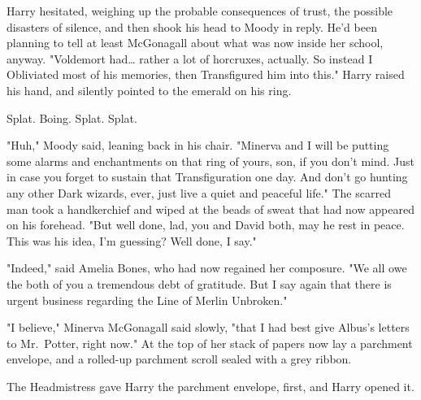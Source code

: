 Harry hesitated, weighing up the probable consequences of trust, the possible
disasters of silence, and then shook his head to Moody in reply. He'd been
planning to tell at least McGonagall about what was now inside her school,
anyway. "Voldemort had{\ldots} rather a lot of horcruxes, actually. So instead
I Obliviated most of his memories, then Transfigured him into this." Harry
raised his hand, and silently pointed to the emerald on his ring.

Splat. Boing. Splat. Splat.

"Huh," Moody said, leaning back in his chair. "Minerva and I will be putting
some alarms and enchantments on that ring of yours, son, if you don't mind.
Just in case you forget to sustain that Transfiguration one day. And don't go
hunting any other Dark wizards, ever, just live a quiet and peaceful life." The
scarred man took a handkerchief and wiped at the beads of sweat that had now
appeared on his forehead. "But well done, lad, you and David both, may he rest
in peace. This was his idea, I'm guessing? Well done, I say."

"Indeed," said Amelia Bones, who had now regained her composure. "We all owe
the both of you a tremendous debt of gratitude. But I say again that there is
urgent business regarding the Line of Merlin Unbroken."

"I believe," Minerva McGonagall said slowly, "that I had best give Albus's
letters to Mr.~Potter, right now." At the top of her stack of papers now lay a
parchment envelope, and a rolled-up parchment scroll sealed with a grey ribbon.

The Headmistress gave Harry the parchment envelope, first, and Harry opened it.
\sbreak

